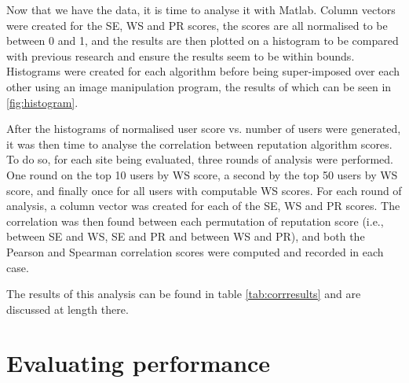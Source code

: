\documentclass[]{final_report}
\begin{document}
Now that we have the data, it is time to analyse it with Matlab. Column vectors were created for the SE, WS and PR scores, the scores are all normalised to be between 0 and 1, and the results are then plotted on a histogram to be compared with previous research and ensure the results seem to be within bounds. Histograms were created for each algorithm before being super-imposed over each other using an image manipulation program, the results of which can be seen in \ref{fig:histogram}.


After the histograms of normalised user score vs. number of users were generated, it was then time to analyse the correlation between reputation algorithm scores. To do so, for each site being evaluated, three rounds of analysis were performed. One round on the top 10 users by WS score, a second by the top 50 users by WS score, and finally once for all users with computable WS scores. For each round of analysis, a column vector was created for each of the SE, WS and PR scores. The correlation was then found between each permutation of reputation score (i.e., between SE and WS, SE and PR and between WS and PR), and both the Pearson and Spearman correlation scores were computed and recorded in each case.


The results of this analysis can be found in table \ref{tab:corrresults} and are discussed at length there.

\section{Evaluating performance}
\end{document}
